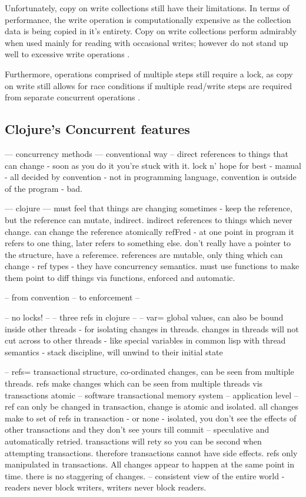 \documentclass[12pt,a4paper]{article}
\begin{document}
Unfortunately, copy on write collections still have their limitations. In terms of performance, the write operation is computationally expensive as the collection data is being copied in it's entirety. Copy on write collections perform admirably when used mainly for reading with occasional writes; however do not stand up well to excessive write operations \cite{javaConcurrency}.

Furthermore, operations comprised of multiple steps still require a lock, as copy on write still allows for race conditions if multiple read/write steps are required from separate concurrent operations \cite{javaConcurrency}.

\subsection{Clojure's Concurrent features}

--- concurrency methods ---
conventional way -- direct references to things that can change - soon as you do it you're stuck with it. lock n' hope for best - manual - all decided by convention - not in programming language, convention is outside of the program - bad.


--- clojure ---
must feel that things are changing sometimes - keep the reference, but the reference can mutate, indirect. indirect references to things which never change. can change the reference atomically refFred - at one point in program it refers to one thing, later refers to something else. don't really have a pointer to the structure, have a referemce. references are mutable, only thing which can change - ref types - they have concurrency semantics. must use functions to make them point to diff things via functions, enforced and automatic. 

-- from convention -- to enforcement --

-- no locks! --
-- three refs in clojure --
-- var= global values, can also be bound inside other threads - for isolating changes in threads. changes in threads will not cut across to other threads - like special variables in common lisp with thread semantics - stack discipline, will unwind to their initial state

-- refs= transactional structure, co-ordinated changes, can be seen from multiple threads. refs make changes which can be seen from multiple threads vis transactions atomic
-- software transactional memory system -- application level -- ref can only be changed in transaction, change is atomic and isolated. all changes make to set of refs in transaction - or none - isolated, you don't see the effects of other transactions and they don't see yours till commit -- speculative and automatically retried. transactions will rety so you can be second when attempting transactions. therefore transactions cannot have side effects. refs only manipulated in transactions. All changes appear to happen at the same point in time. there is no staggering of changes. -- consistent view of the entire world - readers never block writers, writers never block readers.
\end{document}
